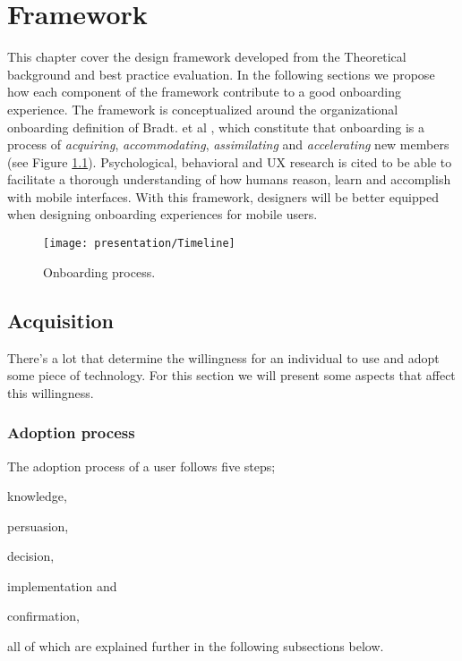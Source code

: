 \chapter{Framework}
\label{chap:framework}

This chapter cover the design framework developed from the Theoretical background and best practice evaluation. In the following sections we propose how each component of the framework contribute to a good onboarding experience. The framework is conceptualized around the organizational onboarding definition of Bradt. et al \cite{Bradt2009}, which constitute that onboarding is a process of \textit{acquiring}, \textit{accommodating}, \textit{assimilating} and \textit{accelerating} new members (see Figure \ref{fig:process}). Psychological, behavioral and UX research is cited to be able to facilitate a thorough understanding of how humans reason, learn and accomplish with mobile interfaces. With this framework, designers will be better equipped when designing onboarding experiences for mobile users.

\begin{figure}[h]
  \centering
    \texttt{[image: presentation/Timeline]}
  \caption{Onboarding process.}
  \label{fig:process}
\end{figure}

\section{Acquisition}
There's a lot that determine the willingness for an individual to use and adopt some piece of technology. For this section we will present some aspects that affect this willingness.

\subsection{Adoption process}

The adoption process of a user follows five steps; \begin{enumerate*}[label=(\(\arabic*\))]
  \item knowledge,
  \item persuasion,
  \item decision,
  \item implementation and
  \item confirmation,
\end{enumerate*} all of which are explained further in the following subsections below.

